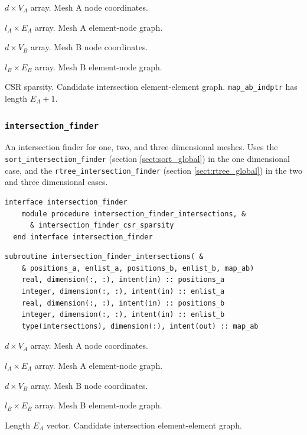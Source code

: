 \documentclass{article}
\begin{document}
\begin{description}[font=\ttfamily\bfseries,leftmargin=2.2\parindent,labelindent=1.7\parindent,noitemsep]
  \item[positions\_a] $d \times V_A$ array. Mesh A node coordinates.
  \item[enlist\_a] $l_A \times E_A$ array. Mesh A element-node graph.
  \item[positions\_b] $d \times V_B$ array. Mesh B node coordinates.
  \item[enlist\_b] $l_B \times E_B$ array. Mesh B element-node graph.
  \item[map\_ab\_indices, map\_ab\_indptr] CSR sparsity. Candidate intersection
    element-element graph. \linebreak \verb+map_ab_indptr+ has length $E_A + 1$.
\end{description}

\subsubsection{\texttt{intersection\_finder}}

An intersection finder for one, two, and three dimensional meshes. Uses the
\verb+sort_intersection_finder+ (section \ref{sect:sort_global}) in the one
dimensional case, and the \verb+rtree_intersection_finder+ (section
\ref{sect:rtree_global}) in the two and three dimensional cases.

\begin{lstlisting}[language=FORTRAN]
  interface intersection_finder
    module procedure intersection_finder_intersections, &
      & intersection_finder_csr_sparsity
  end interface intersection_finder
\end{lstlisting}

\begin{lstlisting}[language=FORTRAN]
  subroutine intersection_finder_intersections( &
    & positions_a, enlist_a, positions_b, enlist_b, map_ab)
    real, dimension(:, :), intent(in) :: positions_a
    integer, dimension(:, :), intent(in) :: enlist_a
    real, dimension(:, :), intent(in) :: positions_b
    integer, dimension(:, :), intent(in) :: enlist_b
    type(intersections), dimension(:), intent(out) :: map_ab
\end{lstlisting}

\begin{description}[font=\ttfamily\bfseries,leftmargin=2.2\parindent,labelindent=1.7\parindent,noitemsep]
  \item[positions\_a] $d \times V_A$ array. Mesh A node coordinates.
  \item[enlist\_a] $l_A \times E_A$ array. Mesh A element-node graph.
  \item[positions\_b] $d \times V_B$ array. Mesh B node coordinates.
  \item[enlist\_b] $l_B \times E_B$ array. Mesh B element-node graph.
  \item[map\_ab] Length $E_A$ vector. Candidate intersection element-element
    graph.
\end{description}
\end{document}
